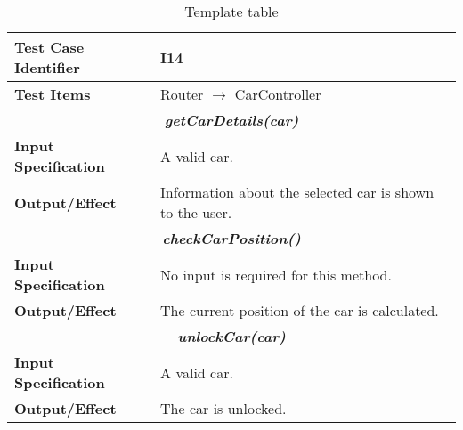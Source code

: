 \begin{table}[h]
	\begin{tabularx}{\textwidth}{l X}
		\hline
		\textbf{Test Case Identifier}	&	I14\\	\hline
		\textbf{Test Items}			&	Router $\rightarrow$ CarController \\	\hline\hline
		\multicolumn{2}{c}{\textbf{\textit{getCarDetails(car)}}}	\\	\hline
			\textbf{Input Specification}	&	A valid car.\\	\hline
			\textbf{Output/Effect}	&	Information about the selected car is shown to the user.\\	\hline\hline
		\multicolumn{2}{c}{\textbf{\textit{checkCarPosition()}}}	\\	\hline
			\textbf{Input Specification}	&	No input is required for this method.\\	\hline
			\textbf{Output/Effect}	&	The current position of the car is calculated.\\	\hline\hline
		\multicolumn{2}{c}{\textbf{\textit{unlockCar(car)}}}	\\	\hline
			\textbf{Input Specification}	&	A valid car.\\	\hline
			\textbf{Output/Effect}	&	The car is unlocked.\\	\hline\hline
	\end{tabularx}
	\captionsetup{textformat=empty,labelformat=blank}
	\caption{Template table}
	\label{table:template-table}
\end{table}